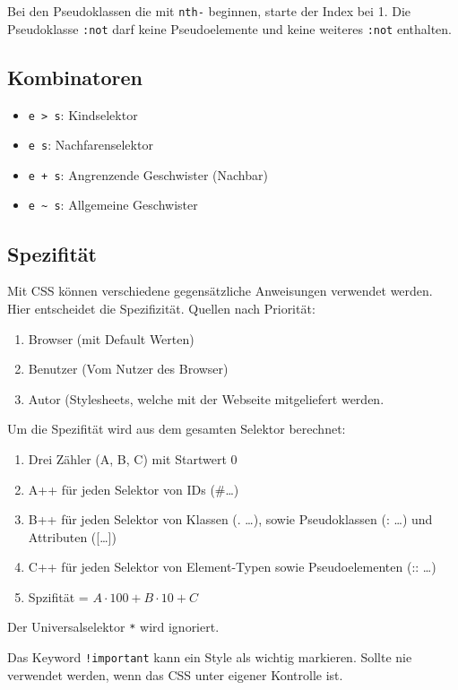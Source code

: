 \documentclass[11pt,twoside,landscape]{article}
\begin{document}
\begin{multicols}{4}
Bei den Pseudoklassen die mit \texttt{nth-} beginnen, starte der Index bei 1. Die Pseudoklasse \texttt{:not} darf keine Pseudoelemente und keine weiteres \texttt{:not} enthalten.


\subsection*{Kombinatoren}
\label{sec:orgbefb30e}
\begin{itemize}
\item \texttt{e > s}: Kindselektor
\item \texttt{e s}: Nachfarenselektor
\item \texttt{e + s}: Angrenzende Geschwister (Nachbar)
\item \texttt{e \textasciitilde{} s}: Allgemeine Geschwister
\end{itemize}


\subsection*{Spezifität}
\label{sec:org6836d57}
Mit CSS können verschiedene gegensätzliche Anweisungen verwendet werden. Hier entscheidet die Spezifizität. Quellen nach Priorität:
\begin{enumerate}
\item Browser (mit Default Werten)
\item Benutzer (Vom Nutzer des Browser)
\item Autor (Stylesheets, welche mit der Webseite mitgeliefert werden.
\end{enumerate}


Um die Spezifität wird aus dem gesamten Selektor berechnet:
\begin{enumerate}
\item Drei Zähler (A, B, C) mit Startwert 0
\item A++ für jeden Selektor von IDs (\#\ldots{})
\item B++ für jeden Selektor von Klassen (. \ldots{}), sowie Pseudoklassen (: \ldots{}) und Attributen ([\ldots{}])
\item C++ für jeden Selektor von Element-Typen sowie Pseudoelementen (:: \ldots{})
\item Spzifität = \(A \cdot 100 + B \cdot 10 + C\)
\end{enumerate}

Der Universalselektor \texttt{*} wird ignoriert.

Das Keyword \texttt{!important} kann ein Style als wichtig markieren. Sollte nie verwendet werden, wenn das CSS unter eigener Kontrolle ist.

\end{multicols}
\end{document}
